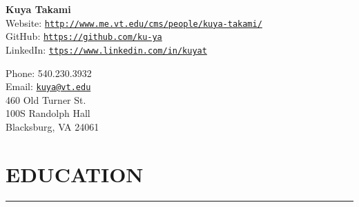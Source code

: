 \documentclass[10pt,letterpaper]{article}
\def\name{\bf Kuya Takami}
\begin{document}

\begin{minipage}{0.7\linewidth}
\vspace{-6mm}
\hspace{5mm}
{\Huge \name}\\

\vspace{0mm}\hspace{7mm}
Website:  \href{http://www.me.vt.edu/cms/people/kuya-takami/}{\tt http://www.me.vt.edu/cms/people/kuya-takami/} \\
\hspace{7mm}
GitHub: \href{https://github.com/ku-ya}{\tt https://github.com/ku-ya}\\
\hspace{7mm}
LinkedIn:  \href{https://www.linkedin.com/in/kuyat}{\tt ttps://www.linkedin.com/in/kuyat} \\
\end{minipage}
\begin{minipage}{0.6\linewidth} 
      Phone:  540.230.3932\\
	Email:  \href{mailto:kuya@vt.edu}{\tt kuya@vt.edu} \\
    460 Old Turner St.\\
  100S Randolph Hall\\
   Blacksburg, VA 24061\\
\end{minipage}
\vspace{-10mm}
\section*{EDUCATION}
\vspace{-2mm}
\hrule
\end{document}
